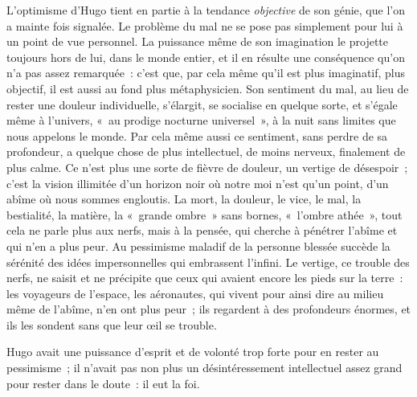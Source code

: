 \documentclass[french,twoside]{book} %
\begin{document}
\noindent L’optimisme d’Hugo tient en partie à la tendance \emph{objective} de son génie, que l’on a mainte fois signalée. Le problème du mal ne se pose pas simplement pour lui à un point de vue personnel. La puissance même de son imagination le projette toujours hors de lui, dans le monde entier, et il en résulte une conséquence qu’on n’a pas assez remarquée : c’est que, par cela même qu’il est plus imaginatif, plus objectif, il est aussi au fond plus métaphysicien. Son sentiment du mal, au lieu de rester une douleur individuelle, s’élargit, se socialise en quelque sorte, et s’égale même à l’univers, « au prodige nocturne universel », à la nuit sans limites que nous appelons le monde. Par cela même aussi ce sentiment, sans perdre de sa profondeur, a quelque chose de plus intellectuel, de moins nerveux, finalement de plus calme. Ce n’est plus une sorte de fièvre de douleur, un vertige de désespoir ; c’est la vision illimitée d’un horizon noir où notre moi n’est qu’un point, d’un abîme où nous sommes engloutis. La mort, la douleur, le vice, le mal, la bestialité, la matière, la « grande ombre » sans bornes, « l’ombre athée », tout cela ne parle plus aux nerfs, mais à la pensée, qui cherche à pénétrer l’abîme et qui n’en a plus peur. Au pessimisme maladif de la personne blessée succède la sérénité des idées impersonnelles qui embrassent l’infini. Le vertige, ce trouble des nerfs, ne saisit et ne précipite que ceux qui avaient encore les pieds sur la terre : les voyageurs de l’espace, les aéronautes, qui vivent pour ainsi dire au milieu même de l’abîme, n’en ont plus peur ; ils regardent à des profondeurs énormes, et ils les sondent sans que leur œil se trouble.\par
Hugo avait une puissance d’esprit et de volonté trop forte pour en rester au pessimisme ; il n’avait pas non plus un désintéressement intellectuel assez grand pour rester dans le doute : il eut la foi.
\end{document}
